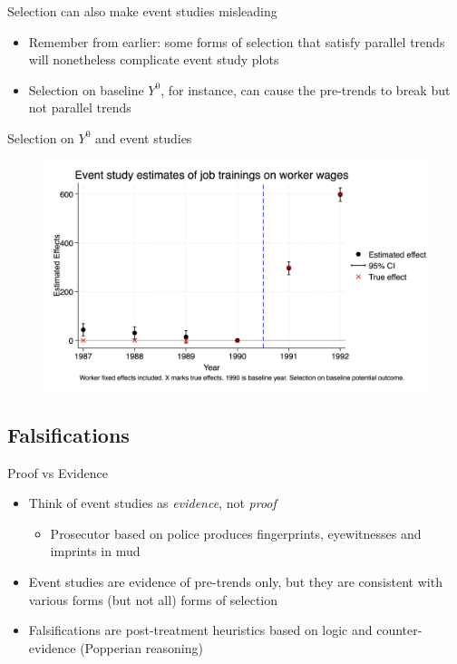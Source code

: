 \documentclass{beamer}
\begin{document}
\begin{frame}{Selection can also make event studies misleading}

\begin{itemize}

\item Remember from earlier: some forms of selection that satisfy parallel trends will nonetheless complicate event study plots
\item Selection on baseline $Y^0$, for instance, can cause the pre-trends to break but not parallel trends
\end{itemize}

\end{frame}

\begin{frame}{Selection on $Y^0$ and event studies}

\begin{figure}
    \centering
    \includegraphics[height=0.70\textheight]{./lecture_includes/selection_y0.png}
\end{figure}

\end{frame}






\subsection{Falsifications}

\begin{frame}{Proof vs Evidence}

\begin{itemize}
\item Think of event studies as \emph{evidence}, not \emph{proof}
	\begin{itemize}
	\item Prosecutor based on police produces fingerprints, eyewitnesses and imprints in mud
	\end{itemize}
\item Event studies are evidence of pre-trends only, but they are consistent with various forms (but not all) forms of selection
\item Falsifications are post-treatment heuristics based on logic and counter-evidence (Popperian reasoning)
\end{itemize}
\end{frame}
\end{document}
